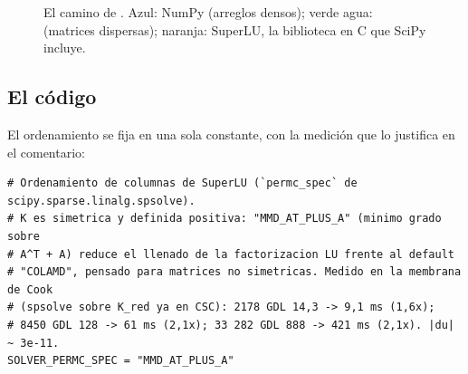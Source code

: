 \documentclass[11pt,a4paper]{article}
\newcommand{\cod}[1]{\texttt{\detokenize{#1}}}
\newcommand{\T}{^{\top}}
\newcommand{\mK}{\bm{K}}
\newcommand{\Kff}{\bm{K}_{ff}}
\begin{document}
\begin{figure}[htbp]
\caption{El camino de \cod{solve_system}. Azul: NumPy (arreglos densos); verde agua: \cod{scipy.sparse} (matrices dispersas); naranja: SuperLU, la biblioteca en C que SciPy incluye.}
\label{fig:tuberia}
\end{figure}

\subsection{El código}

El ordenamiento se fija en una sola constante, con la medición que lo justifica en el comentario:

\begin{lstlisting}[style=py,firstnumber=467,caption={\cod{config/settings.py}.}]
# Ordenamiento de columnas de SuperLU (`permc_spec` de scipy.sparse.linalg.spsolve).
# K es simetrica y definida positiva: "MMD_AT_PLUS_A" (minimo grado sobre
# A^T + A) reduce el llenado de la factorizacion LU frente al default
# "COLAMD", pensado para matrices no simetricas. Medido en la membrana de Cook
# (spsolve sobre K_red ya en CSC): 2178 GDL 14,3 -> 9,1 ms (1,6x);
# 8450 GDL 128 -> 61 ms (2,1x); 33 282 GDL 888 -> 421 ms (2,1x). |du| ~ 3e-11.
SOLVER_PERMC_SPEC = "MMD_AT_PLUS_A"
\end{lstlisting}
\end{document}
